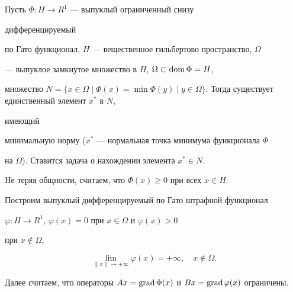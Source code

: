 

\pagestyle{plain} %







\maketitle


\label{begin}





Пусть $\Phi:H\rightarrow R^1$ --- выпуклый ограниченный снизу


дифференцируемый


по Гато функционал, $H$ --- вещественное гильбертово пространство, $\Omega$


--- выпуклое замкнутое множество в $H$, $\Omega \subset \operatorname{dom}\Phi = H$,


множество $N = \{x \in \Omega\mid\Phi(x) = \min{\Phi(y)\mid y \in


\Omega}\}$. Тогда существует единственный элемент $x^*$ в $N$,


имеющий


минимальную норму ($x^*$ --- нормальная точка минимума функционала $\Phi$


на $\Omega$). Ставится задача о нахождении элемента $x^* \in N$.


Hе теряя общности, считаем, что $\Phi(x) \geq 0$ при всех $x \in H$.


Построим выпуклый дифференцируемый по Гато штрафной функционал


$\varphi:H


\rightarrow R^1$, $\varphi(x) = 0$ при $x \in \Omega$ и $\varphi(x) > 0$


при $x \notin \Omega$,


\begin{equation}\label {1}


\lim_{\|x\| \rightarrow +\infty} \varphi(x) = +\infty,\quad x\notin \Omega.


\end{equation}


Далее считаем, что операторы $Ax = \grad\Phi(x)$ и $Bx =


\grad\varphi(x)$ ограничены.





